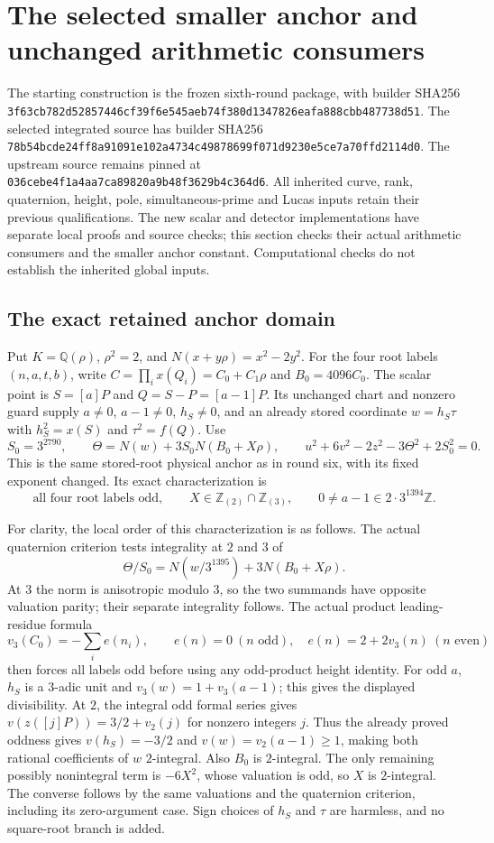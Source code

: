 \section{The selected smaller anchor and unchanged arithmetic consumers}

The starting construction is the frozen sixth-round package, with builder
SHA256
\texttt{3f63cb782d52857446cf39f6e545aeb74f380d1347826eafa888cbb487738d51}.
The selected integrated source has builder SHA256
\texttt{78b54bcde24ff8a91091e102a4734c49878699f071d9230e5ce7a70ffd2114d0}.
The upstream source remains pinned at
\texttt{036cebe4f1a4aa7ca89820a9b48f3629b4c364d6}.
All inherited curve, rank, quaternion, height, pole, simultaneous-prime
and Lucas inputs retain their previous qualifications.  The new scalar
and detector implementations have separate local proofs and source
checks; this section checks their actual arithmetic consumers and the
smaller anchor constant.  Computational checks do not establish the
inherited global inputs.

\subsection{The exact retained anchor domain}

Put $K=\mathbb Q(\rho)$, $\rho^2=2$, and
$N(x+y\rho)=x^2-2y^2$.  For the four root labels $(n,a,t,b)$, write
$C=\prod_i x(Q_i)=C_0+C_1\rho$ and $B_0=4096C_0$.
The scalar point is $S=[a]P$ and $Q=S-P=[a-1]P$.  Its unchanged
chart and nonzero guard supply $a\ne0$, $a-1\ne0$, $h_S\ne0$, and
an already stored coordinate $w=h_S\tau$ with
$h_S^2=x(S)$ and $\tau^2=f(Q)$.  Use
\[
 S_0=3^{2790},\qquad
 \Theta=N(w)+3S_0N(B_0+X\rho),\qquad
 u^2+6v^2-2z^2-3\Theta^2+2S_0^2=0.
\]
This is the same stored-root physical anchor as in round six, with its
fixed exponent changed.  Its exact characterization is
\[
 \text{all four root labels odd},\qquad
 X\in\mathbb Z_{(2)}\cap\mathbb Z_{(3)},\qquad
 0\ne a-1\in2\cdot3^{1394}\mathbb Z.
\]

For clarity, the local order of this characterization is as follows.
The actual quaternion criterion tests integrality at $2$ and $3$ of
\[
 \Theta/S_0=N(w/3^{1395})+3N(B_0+X\rho).
\]
At $3$ the norm is anisotropic modulo $3$, so the two summands have
opposite valuation parity; their separate integrality follows.  The
actual product leading-residue formula
\[
 v_3(C_0)=-\sum_i e(n_i),\qquad
 e(n)=0\ (n\text{ odd}),\quad e(n)=2+2v_3(n)\ (n\text{ even})
\]
then forces all labels odd before using any odd-product height identity.
For odd $a$, $h_S$ is a $3$-adic unit and
$v_3(w)=1+v_3(a-1)$; this gives the displayed divisibility.
At $2$, the integral odd formal series gives
$v(z([j]P))=3/2+v_2(j)$ for nonzero integers $j$.  Thus the already
proved oddness gives $v(h_S)=-3/2$ and
$v(w)=v_2(a-1)\ge1$, making both rational coefficients of $w$
$2$-integral.  Also $B_0$ is $2$-integral.  The only remaining possibly
nonintegral term is $-6X^2$, whose valuation is odd, so $X$ is
$2$-integral.  The converse follows by the same valuations and the
quaternion criterion, including its zero-argument case.  Sign choices
of $h_S$ and $\tau$ are harmless, and no square-root branch is added.

